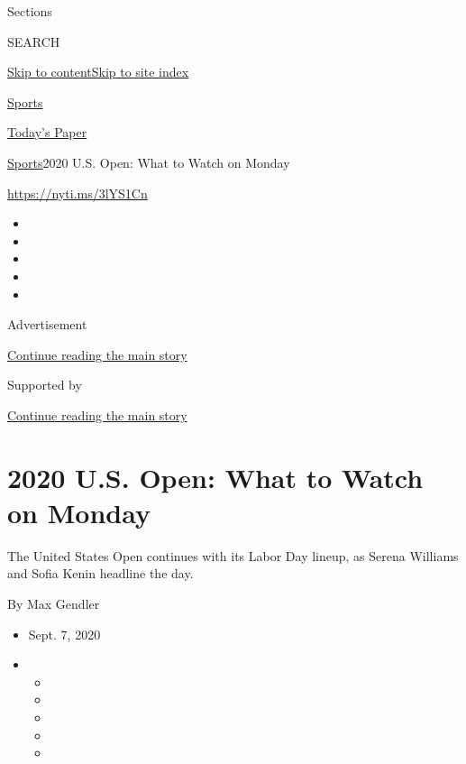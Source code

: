 Sections

SEARCH

\protect\hyperlink{site-content}{Skip to
content}\protect\hyperlink{site-index}{Skip to site index}

\href{https://www.nytimes3xbfgragh.onion/section/sports}{Sports}

\href{https://myaccount.nytimes3xbfgragh.onion/auth/login?response_type=cookie\&client_id=vi}{}

\href{https://www.nytimes3xbfgragh.onion/section/todayspaper}{Today's
Paper}

\href{/section/sports}{Sports}\textbar{}2020 U.S. Open: What to Watch on
Monday

\url{https://nyti.ms/3lYS1Cn}

\begin{itemize}
\item
\item
\item
\item
\item
\end{itemize}

Advertisement

\protect\hyperlink{after-top}{Continue reading the main story}

Supported by

\protect\hyperlink{after-sponsor}{Continue reading the main story}

\hypertarget{2020-us-open-what-to-watch-on-monday}{%
\section{2020 U.S. Open: What to Watch on
Monday}\label{2020-us-open-what-to-watch-on-monday}}

The United States Open continues with its Labor Day lineup, as Serena
Williams and Sofia Kenin headline the day.

By Max Gendler

\begin{itemize}
\item
  Sept. 7, 2020
\item
  \begin{itemize}
  \item
  \item
  \item
  \item
  \item
  \end{itemize}
\end{itemize}

